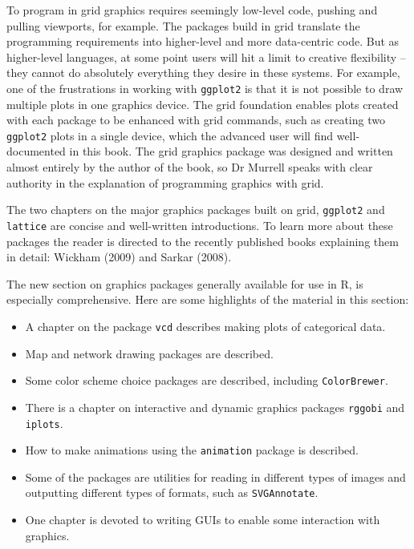 \documentclass[12pt]{article}
\begin{document}
To program in grid graphics requires seemingly low-level code,
pushing and pulling viewports, for example. The packages build in grid
translate the programming requirements into higher-level and more
data-centric code. But as higher-level languages, at some point users will hit a limit to creative
flexibility -- they cannot do absolutely everything they desire
in these systems. For example,
one of the frustrations in working with \texttt{ggplot2} is that it is not possible to draw multiple plots in 
one graphics device. The grid foundation enables plots created with each package to be enhanced
with grid commands, such as creating two \texttt{ggplot2} plots in a single device, which the advanced user will find well-documented in this book.   The grid graphics package was designed and
written almost entirely by the author of the book, so Dr Murrell
speaks with clear authority in the explanation of programming graphics
with grid.

The two chapters on the major graphics packages built on grid,
\texttt{ggplot2} and \texttt{lattice} are concise and well-written
introductions. To learn more about these packages the reader is
directed to the recently published books explaining them in detail:
Wickham (2009) and Sarkar (2008).

The new section on graphics packages generally available for use in R, is especially 
comprehensive. Here are some highlights of the material in this section:

\begin{itemize} \itemsep 0in
\item A chapter on the package \texttt{vcd} describes making
plots of categorical data. 
\item Map and network drawing packages are
described. 
\item Some color scheme choice packages are described, including
\texttt{ColorBrewer}. 
\item There is a chapter on interactive and dynamic
graphics packages \texttt{rggobi} and \texttt{iplots}. 
\item How to make
animations using the \texttt{animation} package is described. 
\item Some of the packages are utilities for reading in different
types of images and outputting different types of formats, such as
\texttt{SVGAnnotate}. 
\item One chapter is devoted to writing GUIs to enable
some interaction with graphics.
\end{itemize}
\end{document}
